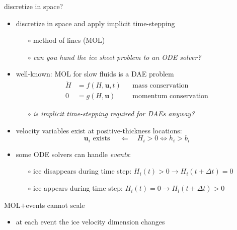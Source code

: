 \documentclass[hide notes,intlimits,usenames,dvipsnames]{beamer}
\begin{document}
\begin{frame}{discretize in space?}

\begin{itemize}
\item discretize in space and apply implicit time-stepping
    \begin{itemize}
    \item[$\circ$] method of lines (MOL)
    \item[$\circ$] \emph{can you hand the ice sheet problem to an ODE solver?}
    \end{itemize}
\item well-known: MOL for slow fluids is a DAE problem
\begin{align*}
\dot H &= f(H,\mathbf{u},t) && \text{mass conservation} \\
     0 &= g(H,\mathbf{u})   && \text{momentum conservation}
\end{align*}
\vspace{-5mm}
    \begin{itemize}
    \item[$\circ$] \emph{is implicit time-stepping required for DAEs anyway?}
    \end{itemize}
\item velocity variables exist at positive-thickness locations:
    $$\mathbf{u}_i \text{ exists } \quad \Longleftarrow \quad H_i > 0 \iff h_i > b_i$$
\item some ODE solvers can handle \emph{events}:
    \begin{itemize}
    \item[$\circ$] ice disappears during time step:  $H_i(t)>0 \to H_i(t+\Delta t)=0$
    \item[$\circ$] ice appears during time step:  $H_i(t)=0 \to H_i(t+\Delta t)>0$
    \end{itemize}
\end{itemize}
\end{frame}


\begin{frame}{MOL$+$events cannot scale}

\begin{center}

\end{center}

\vspace{-6mm}
\begin{itemize}
\item at each event the ice velocity dimension changes
\end{itemize}
\end{frame}
\end{document}
